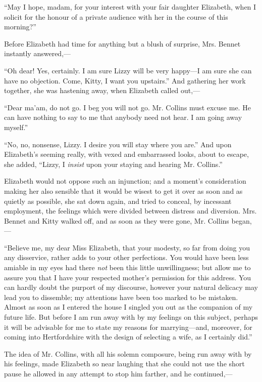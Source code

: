 ``May I hope, madam, for your interest with your fair daughter Elizabeth, when I solicit for the honour of a private audience with her in the course of this morning?''

Before Elizabeth had time for anything but a blush of surprise, Mrs. Bennet instantly answered,---

``Oh dear! Yes, certainly. I am sure Lizzy will be very happy---I am sure she can have no objection. Come, Kitty, I want you upstairs.'' And gathering her work together, she was hastening away, when Elizabeth called out,---

``Dear ma'am, do not go. I beg you will not go. Mr. Collins must excuse me. He can have nothing to say to me that anybody need not hear. I am going away myself.''

``No, no, nonsense, Lizzy. I desire you will stay where you are.'' And upon Elizabeth's seeming really, with vexed and embarrassed looks, about to escape, she added, ``Lizzy, I \textit{insist} upon your staying and hearing Mr. Collins.''

Elizabeth would not oppose such an injunction; and a moment's consideration making her also sensible that it would be wisest to get it over as soon and as quietly as possible, she sat down again, and tried to conceal, by incessant employment, the feelings which were divided between distress and diversion. Mrs. Bennet and Kitty walked off, and as soon as they were gone, Mr. Collins began,---

``Believe me, my dear Miss Elizabeth, that your modesty, so far from doing you any disservice, rather adds to your other perfections. You would have been less amiable in my eyes had there \textit{not} been this little unwillingness; but allow me to assure you that I have your respected mother's permission for this address. You can hardly doubt the purport of my discourse, however your natural delicacy may lead you to dissemble; my attentions have been too marked to be mistaken. Almost as soon as I entered the house I singled you out as the companion of my future life. But before I am run away with by my feelings on this subject, perhaps it will be advisable for me to state my reasons for marrying---and, moreover, for coming into Hertfordshire with the design of selecting a wife, as I certainly did.''

The idea of Mr. Collins, with all his solemn composure, being run away with by his feelings, made Elizabeth so near laughing that she could not use the short pause he allowed in any attempt to stop him farther, and he continued,---

